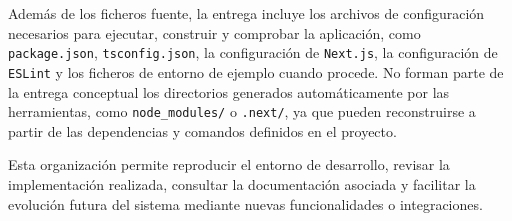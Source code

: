 Además de los ficheros fuente, la entrega incluye los archivos de configuración necesarios para ejecutar, construir y comprobar la aplicación, como \texttt{package.json}, \texttt{tsconfig.json}, la configuración de \texttt{Next.js}, la configuración de \texttt{ESLint} y los ficheros de entorno de ejemplo cuando procede. No forman parte de la entrega conceptual los directorios generados automáticamente por las herramientas, como \texttt{node\_modules/} o \texttt{.next/}, ya que pueden reconstruirse a partir de las dependencias y comandos definidos en el proyecto.

Esta organización permite reproducir el entorno de desarrollo, revisar la implementación realizada, consultar la documentación asociada y facilitar la evolución futura del sistema mediante nuevas funcionalidades o integraciones.
